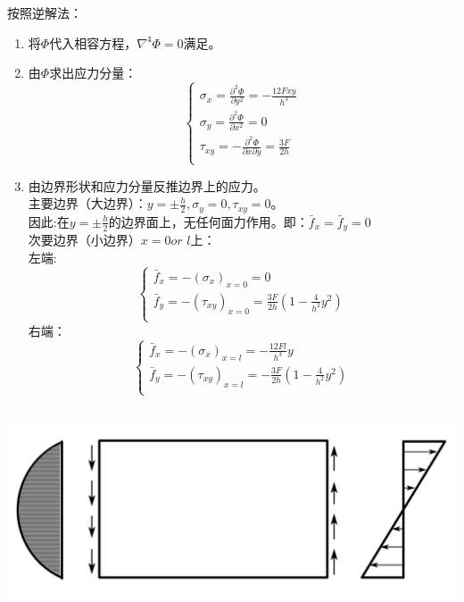 	\begin{remark}
		按照逆解法：
		\begin{enumerate}
			\item 将$\varPhi$代入相容方程，$\nabla ^4\Phi =0$满足。
			\item 由$\varPhi$求出应力分量：\[\begin{cases}
			\sigma _x=\frac{\partial ^2\varPhi}{\partial y^2}=-\frac{12Fxy}{h^3}\\
			\sigma _y=\frac{\partial ^2\varPhi}{\partial x^2}=0\\
			\tau _{xy}=-\frac{\partial ^2\varPhi}{\partial x\partial y}=\frac{3F}{2h}\\
			\end{cases}\]
			\item 由边界形状和应力分量反推边界上的应力。\\
			主要边界（大边界）：$y=\pm \frac{h}{2},\sigma _y=0,\tau _{xy}=0\text{。}$\\
			因此:在$y=\pm \frac{h}{2}$的边界面上，无任何面力作用。即：$\bar{f}_x=\bar{f}_y=0$\\
			次要边界（小边界）$x=0 or\,\,l$上：\\
			左端:\[\begin{cases}
			\bar{f}_x=-\left( \sigma _x \right) _{x=0}=0\\
			\bar{f}_y=-\left( \tau _{xy} \right) _{x=0}=\frac{3F}{2h}\left( 1-\frac{4}{h^2}y^2 \right)\\
			\end{cases}\]
			右端：\[\begin{cases}
			\bar{f}_x=-\left( \sigma _x \right) _{x=l}=-\frac{12Fl}{h^3}y\\
			\bar{f}_y=-\left( \tau _{xy} \right) _{x=l}=-\frac{3F}{2h}\left( 1-\frac{4}{h^2}y^2 \right)\\
			\end{cases}\]\\
		\end{enumerate}
		\centerline{\includegraphics[scale=0.6]{figure/3-2.png}}
	\end{remark}
